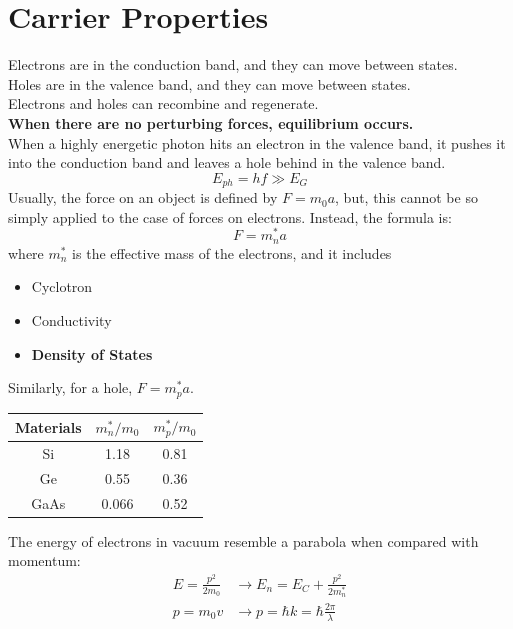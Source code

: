 \documentclass[nobib]{tufte-handout}
\begin{document}
\section{Carrier Properties}
Electrons are in the conduction band, and they can move between states.\\
Holes are in the valence band, and they can move between states.\\
Electrons and holes can recombine and regenerate.\\
\textbf{When there are no perturbing forces, equilibrium occurs.}\\
When a highly energetic photon hits an electron in the valence band, it pushes it into the conduction band and leaves a hole behind in the valence band.\\
\begin{equation*}
    E_{ph} = hf \gg E_G
\end{equation*}
Usually, the force on an object is defined by $F = m_0 a$, but, this cannot be so simply applied to the case of forces on electrons. Instead, the formula is:
\begin{equation*}
    F = m_n^* a
\end{equation*}
where $m_n^*$ is the effective mass of the electrons, and it includes
\begin{itemize}
    \item Cyclotron
    \item Conductivity
    \item \textbf{Density of States}
\end{itemize}
Similarly, for a hole, $F = m_p^* a$.
\begin{center}
\begin{tabular}{|c|c|c|}
        \hline
        Materials & $m_n^*/m_0$ & $m_p^*/m_0$\\
        \hline
        Si & 1.18 & 0.81 \\
        \hline
        Ge & 0.55 & 0.36 \\
        \hline
        GaAs & 0.066 & 0.52\\
        \hline
\end{tabular}
\end{center}
The energy of electrons in vacuum resemble a parabola when compared with momentum:
\begin{align*}
    E = \frac{p^2}{2m_0} &\rightarrow E_n = E_C+\frac{p^2}{2m_n^*}\\
    p = m_0 v &\rightarrow p = \hbar k = \hbar \frac{2\pi}{\lambda}
\end{align*}
\end{document}
